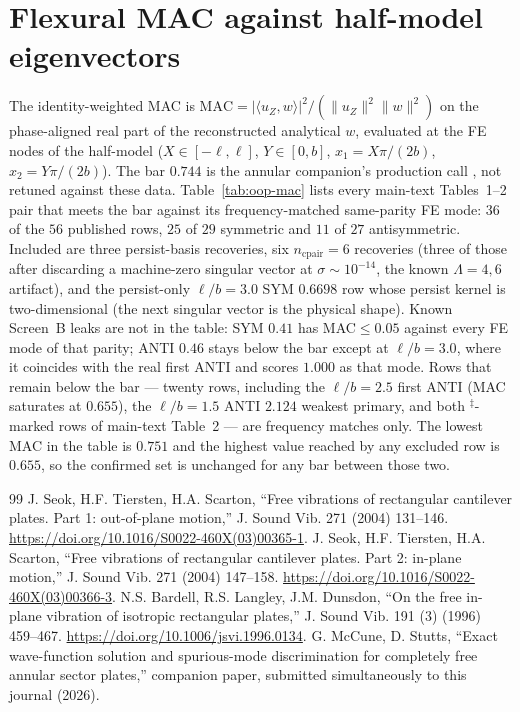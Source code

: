 \documentclass[11pt]{article}
\begin{document}
\section{Flexural MAC against half-model eigenvectors}\label{sec:sm-mac}
The identity-weighted MAC is
$\mathrm{MAC}=|\langle u_Z,w\rangle|^2/(\|u_Z\|^2\|w\|^2)$ on the
phase-aligned real part of the reconstructed analytical $w$, evaluated
at the FE nodes of the half-model ($X\in[-\ell,\ell]$, $Y\in[0,b]$,
$x_1=X\pi/(2b)$, $x_2=Y\pi/(2b)$). The bar $0.744$ is the annular companion's production call
\cite{mccune2026annular}, not retuned against these data.
Table~\ref{tab:oop-mac}
lists every main-text Tables~1--2 pair that meets the bar against its
frequency-matched same-parity FE mode: $36$ of the $56$ published rows,
$25$ of $29$ symmetric and $11$ of $27$ antisymmetric. Included are three
persist-basis recoveries, six $n_{\mathrm{cpair}}=6$ recoveries (three of those after
discarding a machine-zero singular vector at $\sigma\sim 10^{-14}$,
the known $\Lambda=4,6$ artifact), and the persist-only
$\ell/b=3.0$ SYM $0.6698$ row whose persist kernel is two-dimensional
(the next singular vector is the physical shape). Known Screen~B leaks
are not in the table: SYM $0.41$ has MAC${}\le 0.05$ against every FE
mode of that parity; ANTI $0.46$ stays below the bar except at
$\ell/b=3.0$, where it coincides with the real first ANTI and scores
$1.000$ as that mode. Rows that remain
below the bar --- twenty rows, including the $\ell/b=2.5$ first ANTI (MAC
saturates at $0.655$), the $\ell/b=1.5$ ANTI $2.124$ weakest primary, and
both $^\ddagger$-marked rows of main-text Table~2 --- are frequency
matches only. The lowest MAC in the table is $0.751$ and the highest value
reached by any excluded row is $0.655$, so the confirmed set is unchanged
for any bar between those two.



\begin{thebibliography}{99}\small
\setlength{\itemsep}{0pt}
\setlength{\parsep}{0pt}
 J. Seok, H.F. Tiersten, H.A. Scarton, ``Free vibrations of
rectangular cantilever plates. Part 1: out-of-plane motion,'' J. Sound
Vib. 271 (2004) 131--146. \url{https://doi.org/10.1016/S0022-460X(03)00365-1}.
 J. Seok, H.F. Tiersten, H.A. Scarton, ``Free vibrations of
rectangular cantilever plates. Part 2: in-plane motion,'' J. Sound Vib.
271 (2004) 147--158. \url{https://doi.org/10.1016/S0022-460X(03)00366-3}.
 N.S. Bardell, R.S. Langley, J.M. Dunsdon, ``On the
free in-plane vibration of isotropic rectangular plates,'' J. Sound Vib.
191 (3) (1996) 459--467. \url{https://doi.org/10.1006/jsvi.1996.0134}.
 G. McCune, D. Stutts, ``Exact wave-function
solution and spurious-mode discrimination for completely free annular
sector plates,'' companion paper, submitted simultaneously to this
journal (2026).
\end{thebibliography}
\end{document}
